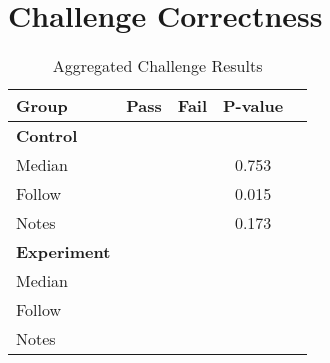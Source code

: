 \section{Challenge Correctness}
\begin{table}
    \begin{center}
        \caption{Aggregated Challenge Results}
        \label{table:challscore}
        \begin{tabular}{@{}lcccc@{}}
        \toprule
        \textbf{Group} & \textbf{Pass} & \textbf{Fail} & \textbf{P-value} \\
        \midrule
        \textbf{Control} \\
            \hspace{3mm}Median & \ctlmediancorrect{} & \fpeval{\ctlcount{} - \ctlmediancorrect{}} & 0.753 \\
            \hspace{3mm}Follow & \ctlfollowcorrect{} & \fpeval{\ctlcount{} - \ctlfollowcorrect{}} & 0.015 \\
            \hspace{3mm}Notes & \ctlnotescorrect{} & \fpeval{\ctlcount{} - \ctlnotescorrect{}} & 0.173 \\
        \midrule
        \textbf{Experiment} \\
            \hspace{3mm}Median & \expmediancorrect{} & \fpeval{\expcount{} - \expmediancorrect{}} \\
            \hspace{3mm}Follow & \expfollowcorrect{} & \fpeval{\expcount{} - \expfollowcorrect{}} \\
            \hspace{3mm}Notes & \expnotescorrect{} & \fpeval{\expcount{} - \expnotescorrect{}} \\
        \end{tabular}
    \end{center}
\end{table}

